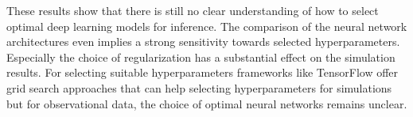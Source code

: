 These results show that there is still no clear understanding of how to select optimal deep learning models for inference.
The comparison of the neural network architectures even implies a strong sensitivity towards selected hyperparameters.
Especially the choice of regularization has a substantial effect on the simulation results.
For selecting suitable hyperparameters frameworks like TensorFlow\textsuperscript{\textregistered} offer grid search approaches that can help selecting hyperparameters for simulations but for observational data, the choice of optimal neural networks remains unclear.

